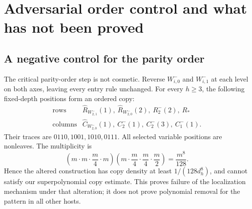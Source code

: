 \documentclass[11pt,a4paper]{article}
\theoremstyle{remark}
\newcommand{\ancR}{\widehat R}
\newcommand{\ancC}{\widehat C}
\begin{document}
\section{Adversarial order control and what has not been proved}
\label{sec:audit}

\subsection{A negative control for the parity order}
The critical parity-order step is not cosmetic. Reverse
\(W_{i,0}^-\) and \(W_{i,1}^-\) at each level on both axes, leaving
every entry rule unchanged. For every \(h\ge3\), the following
fixed-depth positions form an ordered copy:
\[
\begin{array}{c|l}
\text{rows}&
\ancR_{W_{2,1}^-}(1),\
\ancR_{W_{2,0}^-}(2),\
R_2^-(2),\ R_*\\
\text{columns}&
\ancC_{W_{2,0}^-}(1),\
C_2^-(1),\ C_2^-(3),\ C_1^-(1).
\end{array}
\]
Their traces are \(0110,1001,1010,0111\).
All selected variable positions are nonleaves. The multiplicity is
\[
\left(m\cdot m\cdot\frac m4\cdot m\right)
\left(m\cdot\frac m4\cdot\frac m4\cdot\frac m2\right)
=\frac{m^8}{128}.
\]
Hence the altered construction has copy density at least
\(1/(128d_h^8)\), and cannot satisfy our superpolynomial copy
estimate. This proves failure of the localization mechanism under
that alteration; it does not prove polynomial removal for the
pattern in all other hosts.
\end{document}
